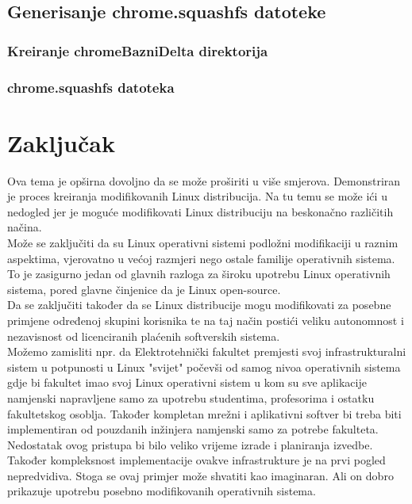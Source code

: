\documentclass[12pt,vi]{mitthesis}
\begin{document}
\section*{Generisanje chrome.squashfs datoteke}
\indent

\subsection*{Kreiranje chromeBazniDelta direktorija}
\indent

\subsection*{chrome.squashfs datoteka}
\indent


\chapter*{Zaključak}
\indent
Ova tema je opširna dovoljno da se može proširiti u više smjerova. Demonstriran je proces kreiranja modifikovanih Linux distribucija. Na tu temu se može ići u nedogled jer je moguće modifikovati Linux distribuciju na beskonačno različitih načina.\\
Može se zaključiti da su Linux operativni sistemi podložni modifikaciji u raznim aspektima, vjerovatno u većoj razmjeri nego ostale familije operativnih sistema. To je zasigurno jedan od glavnih razloga za široku upotrebu Linux operativnih sistema, pored glavne činjenice da je Linux open-source.\\
Da se zaključiti također da se Linux distribucije mogu modifikovati za posebne primjene određenoj skupini korisnika te na taj način postići veliku autonomnost i nezavisnost od licenciranih plaćenih softverskih sistema.\\
Možemo zamisliti npr. da Elektrotehnički fakultet premjesti svoj infrastrukturalni sistem u potpunosti u Linux "svijet" počevši od samog nivoa operativnih sistema gdje bi fakultet imao svoj Linux operativni sistem u kom su sve aplikacije namjenski napravljene samo za upotrebu studentima, profesorima i ostatku fakultetskog osoblja. Također kompletan mrežni i aplikativni softver bi treba biti implementiran od pouzdanih inžinjera namjenski samo za potrebe fakulteta.\\
Nedostatak ovog pristupa bi bilo veliko vrijeme izrade i planiranja izvedbe. Također kompleksnost implementacije ovakve infrastrukture je na prvi pogled nepredvidiva. Stoga se ovaj primjer može shvatiti kao imaginaran. Ali on dobro prikazuje upotrebu posebno modifikovanih operativnih sistema.\\
\end{document}
